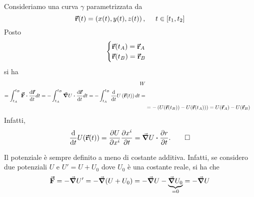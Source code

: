 \begin{demonstration}
	Consideriamo una curva $\gamma$ parametrizzata da
	\begin{equation*}
		\vb*{\va{r}}(t)=\left(x(t),y(t),z(t)\right),\ \quad t\in\left[t_1,t_2\right]
	\end{equation*}
	Posto
	\begin{equation*}
		\begin{cases}
			\vb*{\va{r}}(t_A)=\vb*{\va{r}}_A\\
			\vb*{\va{r}}(t_B)=\vb*{\va{r}}_B
		\end{cases}
	\end{equation*}
si ha
\begin{align*}
	W\\=\int_{t_A}^{t_B}\vba{F}\vdot\dv{\vba{r}}{t}dt=-\int_{t_A}^{t_B}\grad{U}\vdot\dv{\vba{r}}{t}dt=-\int_{t_A}^{t_B}\dv{t}U\left(\vba{r}(t)\right)dt=\\
	&=-\left(U(\vba{r}(t_B))-U(\vba{r}(t_A))\right)=U(\vba{r}_A)-U(\vba{r}_B)
\end{align*}
Infatti,
\begin{equation*}
	\dv{t}U(\vba{r}(t))=\pdv{U}{x^i}\pdv{x^i}{t}=\grad{U}\vdot\pdv{r}{t}.\qedhere
\end{equation*}
\end{demonstration}
\begin{observe}
	Il potenziale è sempre definito a meno di costante additiva. Infatti, se considero due potenziali $U$ e $U'=U+U_0$ dove $U_0$ è una costante reale, si ha che
	\begin{equation*}
		\vb*{\va{F}}=-\grad{U'}=-\grad{(U+U_0)}=-\grad{U}-\underbrace{\grad{U_0}}_{=0}=-\grad{U}
	\end{equation*}
\end{observe}
